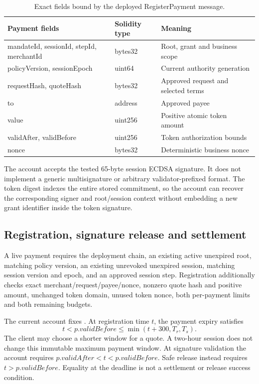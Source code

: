 \begin{table}[htbp]\centering\small
\begin{tabularx}{\linewidth}{L{5.6cm}L{2cm}Y}\toprule
Payment fields & Solidity type & Meaning\\\midrule
mandateId, sessionId, stepId, merchantId & bytes32 & Root, grant and business scope\\
policyVersion, sessionEpoch & uint64 & Current authority generation\\
requestHash, quoteHash & bytes32 & Approved request and selected terms\\
to & address & Approved payee\\
value & uint256 & Positive atomic token amount\\
validAfter, validBefore & uint256 & Token authorization bounds\\
nonce & bytes32 & Deterministic business nonce\\\bottomrule
\end{tabularx}\caption{Exact fields bound by the deployed RegisterPayment message.}\label{tab:payment-fields}\end{table}

The account accepts the tested 65-byte session ECDSA signature. It does not implement a generic multisignature or arbitrary validator-prefixed format. The token digest indexes the entire stored commitment, so the account can recover the corresponding signer and root/session context without embedding a new grant identifier inside the token signature.

\subsection{Registration, signature release and settlement}

A live payment requires the deployment chain, an existing active unexpired root, matching policy version, an existing unrevoked unexpired session, matching session version and epoch, and an approved session step. Registration additionally checks exact merchant/request/payee/nonce, nonzero quote hash and positive amount, unchanged token domain, unused token nonce, both per-payment limits and both remaining budgets.

The current account fixes . At registration time $t$, the payment expiry satisfies
\begin{equation}
 t < p.validBefore \le \min(t+300,T_r,T_s).
\end{equation}
The client may choose a shorter window for a quote. A two-hour session does not change this immutable maximum payment window. At signature validation the account requires $p.validAfter<t<p.validBefore$. Safe release instead requires $t>p.validBefore$. Equality at the deadline is not a settlement or release success condition.

